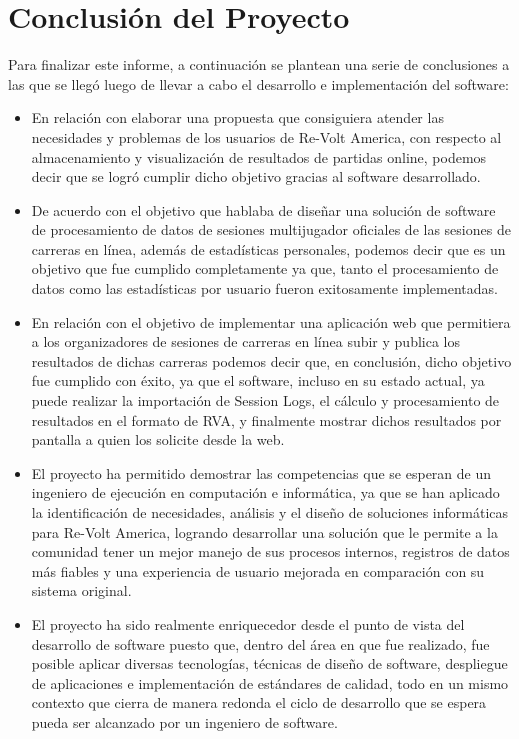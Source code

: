 \chapter{Conclusión del Proyecto}
Para finalizar este informe, a continuación se plantean una serie de conclusiones a las que se llegó luego de llevar a cabo el desarrollo e implementación del software:

\begin{itemize}
	\item En relación con elaborar una propuesta que consiguiera atender las necesidades y problemas de los usuarios de Re-Volt America, con respecto al almacenamiento y visualización de resultados de partidas online, podemos decir que se logró cumplir dicho objetivo gracias al software desarrollado.
	\item De acuerdo con el objetivo que hablaba de diseñar una solución de software de procesamiento de datos de sesiones multijugador oficiales de las sesiones de carreras en línea, además de estadísticas personales, podemos decir que es un objetivo que fue cumplido completamente ya que, tanto el procesamiento de datos como las estadísticas por usuario fueron exitosamente implementadas.
	\item En relación con el objetivo de implementar una aplicación web que permitiera a los organizadores de sesiones de carreras en línea subir y publica los resultados de dichas carreras podemos decir que, en conclusión, dicho objetivo fue cumplido con éxito, ya que el software, incluso en su estado actual, ya puede realizar la importación de Session Logs, el cálculo y procesamiento de resultados en el formato de RVA, y finalmente mostrar dichos resultados por pantalla a quien los solicite desde la web.
	\item El proyecto ha permitido demostrar las competencias que se esperan de un ingeniero de ejecución en computación e informática, ya que se han aplicado la identificación de necesidades, análisis y el diseño de soluciones informáticas para Re-Volt America, logrando desarrollar una solución que le permite a la comunidad tener un mejor manejo de sus procesos internos, registros de datos más fiables y una experiencia de usuario mejorada en comparación con su sistema original. 
	\item El proyecto ha sido realmente enriquecedor desde el punto de vista del desarrollo de software puesto que, dentro del área en que fue realizado, fue posible aplicar diversas tecnologías, técnicas de diseño de software, despliegue de aplicaciones e implementación de estándares de calidad, todo en un mismo contexto que cierra de manera redonda el ciclo de desarrollo que se espera pueda ser alcanzado por un ingeniero de software.
\end{itemize}
